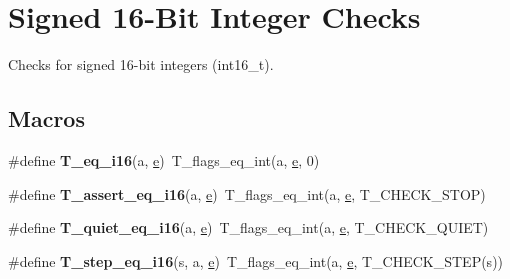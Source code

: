\hypertarget{group__RTEMSTestFrameworkChecksInt16}{}\section{Signed 16-\/Bit Integer Checks}
\label{group__RTEMSTestFrameworkChecksInt16}


Checks for signed 16-\/bit integers (int16\+\_\+t).  


\subsection*{Macros}
\begin{DoxyCompactItemize}
\item 
\mbox{\label{group__RTEMSTestFrameworkChecksInt16_gaefa38da5afe800ce257c522d6e802830}} 
\#define {\bfseries T\+\_\+eq\+\_\+i16}(a,  \mbox{\hyperlink{sun4u_2tte_8h_a8b0b9ed08e0e18920ec2682f48228c27}{e}})~T\+\_\+flags\+\_\+eq\+\_\+int(a, \mbox{\hyperlink{sun4u_2tte_8h_a8b0b9ed08e0e18920ec2682f48228c27}{e}}, 0)
\item 
\mbox{\label{group__RTEMSTestFrameworkChecksInt16_ga4a22f74ff992c485e426543d2f7b7ccf}} 
\#define {\bfseries T\+\_\+assert\+\_\+eq\+\_\+i16}(a,  \mbox{\hyperlink{sun4u_2tte_8h_a8b0b9ed08e0e18920ec2682f48228c27}{e}})~T\+\_\+flags\+\_\+eq\+\_\+int(a, \mbox{\hyperlink{sun4u_2tte_8h_a8b0b9ed08e0e18920ec2682f48228c27}{e}}, T\+\_\+\+C\+H\+E\+C\+K\+\_\+\+S\+T\+OP)
\item 
\mbox{\label{group__RTEMSTestFrameworkChecksInt16_gaf1d308a7a586c27bc6132237ffa3e1ff}} 
\#define {\bfseries T\+\_\+quiet\+\_\+eq\+\_\+i16}(a,  \mbox{\hyperlink{sun4u_2tte_8h_a8b0b9ed08e0e18920ec2682f48228c27}{e}})~T\+\_\+flags\+\_\+eq\+\_\+int(a, \mbox{\hyperlink{sun4u_2tte_8h_a8b0b9ed08e0e18920ec2682f48228c27}{e}}, T\+\_\+\+C\+H\+E\+C\+K\+\_\+\+Q\+U\+I\+ET)
\item 
\mbox{\label{group__RTEMSTestFrameworkChecksInt16_ga0c1439d578cb7938399f46a1395d9f06}} 
\#define {\bfseries T\+\_\+step\+\_\+eq\+\_\+i16}(s,  a,  \mbox{\hyperlink{sun4u_2tte_8h_a8b0b9ed08e0e18920ec2682f48228c27}{e}})~T\+\_\+flags\+\_\+eq\+\_\+int(a, \mbox{\hyperlink{sun4u_2tte_8h_a8b0b9ed08e0e18920ec2682f48228c27}{e}}, T\+\_\+\+C\+H\+E\+C\+K\+\_\+\+S\+T\+EP(s))

\end{DoxyCompactItemize}
